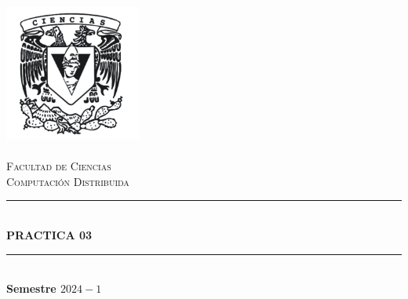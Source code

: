 \begin{titlepage}
    \center%
    \newcommand{\HRule}{\rule{\linewidth}{0.5mm}} 
    
    \includegraphics[width=4.5cm]{IMA/Ciencias.png} \\ 
    
    \quad \\[1.5cm]
    \textsc{\Large Facultad de Ciencias}\\[0.5cm] %
    \textsc{\Large Computación Distribuida}\\[0.5cm] %
    \makeatletter
        \HRule\\ [0.4cm]
            { \huge \bfseries PRACTICA 03}\\
        \HRule\\ [0.4cm]
    \large\textbf{Semestre $2024-1$}\\
    

\end{titlepage}
